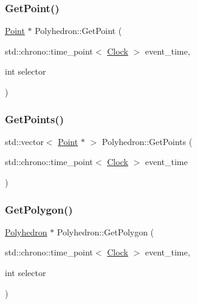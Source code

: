 \mbox{\label{classPolyhedron_a4d61f89c56e15d96008856cfb540d558}} 
\subsubsection{\texorpdfstring{Get\+Point()}{GetPoint()}}
{\footnotesize\ttfamily \mbox{\hyperlink{classPoint}{Point}} $\ast$ Polyhedron\+::\+Get\+Point (\begin{DoxyParamCaption}\item[{std\+::chrono\+::time\+\_\+point$<$ \mbox{\hyperlink{universe_8h_a0ef8d951d1ca5ab3cfaf7ab4c7a6fd80}{Clock}} $>$}]{event\+\_\+time,  }\item[{int}]{selector }\end{DoxyParamCaption})}

\mbox{\label{classPolyhedron_a1430429d6c8447e90b8c94ca46496a59}} 
\subsubsection{\texorpdfstring{Get\+Points()}{GetPoints()}}
{\footnotesize\ttfamily std\+::vector$<$ \mbox{\hyperlink{classPoint}{Point}} $\ast$ $>$ Polyhedron\+::\+Get\+Points (\begin{DoxyParamCaption}\item[{std\+::chrono\+::time\+\_\+point$<$ \mbox{\hyperlink{universe_8h_a0ef8d951d1ca5ab3cfaf7ab4c7a6fd80}{Clock}} $>$}]{event\+\_\+time }\end{DoxyParamCaption})}

\mbox{\label{classPolyhedron_a8b197b9eb163bdc83d9669d592bacac1}} 
\subsubsection{\texorpdfstring{Get\+Polygon()}{GetPolygon()}}
{\footnotesize\ttfamily \mbox{\hyperlink{classPolyhedron}{Polyhedron}} $\ast$ Polyhedron\+::\+Get\+Polygon (\begin{DoxyParamCaption}\item[{std\+::chrono\+::time\+\_\+point$<$ \mbox{\hyperlink{universe_8h_a0ef8d951d1ca5ab3cfaf7ab4c7a6fd80}{Clock}} $>$}]{event\+\_\+time,  }\item[{int}]{selector }\end{DoxyParamCaption})}

